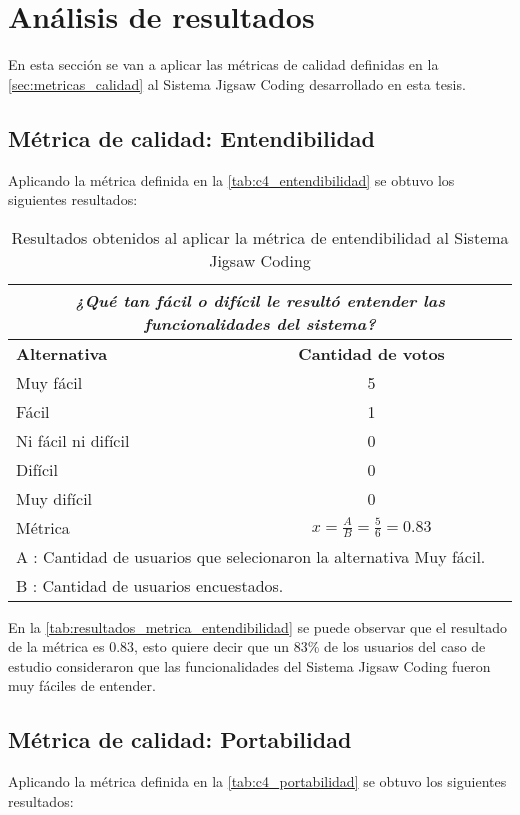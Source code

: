 \chapter{Análisis de resultados}
En esta sección se van a aplicar las métricas de calidad definidas en la \autoref{sec:metricas_calidad} al Sistema Jigsaw Coding desarrollado en esta tesis.

\section{Métrica de calidad: Entendibilidad}
Aplicando la métrica definida en la \autoref{tab:c4_entendibilidad} se obtuvo los siguientes resultados:

\begin{longtable}{lc}
	\caption{Resultados obtenidos al aplicar la métrica de entendibilidad al Sistema Jigsaw Coding}
	\label{tab:resultados_metrica_entendibilidad}\\
	\toprule[0.7mm]
	\multicolumn{2}{c}{\emph{¿Qué tan fácil o difícil le resultó entender las funcionalidades del sistema?}}\\
	\midrule
	\textbf{Alternativa} & \textbf{Cantidad de votos} \\
	\midrule
	Muy fácil & 5 \\
	Fácil & 1 \\
	Ni fácil ni difícil & 0 \\
	Difícil & 0 \\
	Muy difícil & 0 \\
	\midrule
	Métrica & $x = \frac{A}{B} = \frac{5}{6} = 0.83$		\\
	\multicolumn{2}{l}{A : Cantidad de usuarios que selecionaron la alternativa Muy fácil.}\\
	\multicolumn{2}{l}{B : Cantidad de usuarios encuestados.}\\
	\bottomrule[0.7mm]
\end{longtable}

En la \autoref{tab:resultados_metrica_entendibilidad} se puede observar que el resultado de la métrica es 0.83, esto quiere decir que un 83\% de los usuarios del caso de estudio consideraron que las funcionalidades del Sistema Jigsaw Coding fueron muy fáciles de entender.

\section{Métrica de calidad: Portabilidad}
Aplicando la métrica definida en la \autoref{tab:c4_portabilidad} se obtuvo los siguientes resultados:

